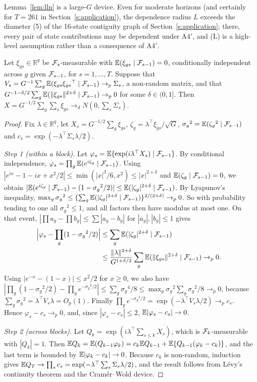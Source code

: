 \noindent Lemma~\ref{lem:lln} is a large-$G$ device. Even for moderate horizons (and certainly for
$T=261$ in Section~\ref{s:application}), the dependence radius $L$ exceeds the diameter (5) of the
16-state contiguity graph of Section~\ref{s:application}; there, every pair of state contributions
may be dependent under A4$'$, and (L) is a high-level assumption rather than a consequence of A4$'$.

\begin{lemma}
\label{lem:clt}
Let $\xi_{gs}\in\mathbb R^q$ be $\mathcal{F}_s$-measurable with $\mathbb{E}(\xi_{gs}\mid\mathcal{F}_{s-1})=0$, conditionally
independent across $g$ given $\mathcal{F}_{s-1}$, for $s=1,\dots,T$. Suppose that
$V_s=G^{-1}\sum_g\mathbb{E}(\xi_{gs}\xi_{gs}{}^{\top}\mid\mathcal{F}_{s-1})\to_p\Sigma_s$, a non-random matrix, and that
$G^{-1-\delta/2}\sum_g\mathbb{E}(\|\xi_{gs}\|^{2+\delta}\mid\mathcal{F}_{s-1})\to_p0$ for some $\delta\in(0,1]$. Then
$X=G^{-1/2}\sum_g\sum_s\xi_{gs}\to_dN(0,\sum_s\Sigma_s)$.
\end{lemma}

\begin{proof}
Fix $\lambda\in\mathbb R^q$, let $X_s=G^{-1/2}\sum_g\xi_{gs}$, $\zeta_g=\lambda^{\top}\xi_{gs}/\sqrt G$,
$\sigma_g{}^2=\mathbb{E}(\zeta_g{}^2\mid\mathcal{F}_{s-1})$ and $c_s=\exp(-\lambda^{\top}\Sigma_s\lambda/2)$.

\emph{Step 1 (within a block).} Let $\varphi_s=\mathbb{E}\{\exp(i\lambda^{\top}X_s)\mid\mathcal{F}_{s-1}\}$. By conditional
independence, $\varphi_s=\prod_g\mathbb{E}(e^{i\zeta_g}\mid\mathcal{F}_{s-1})$. Using $|e^{ix}-1-ix+x^2/2|\le\min(|x|^3/6,x^2)\le|x|^{2+\delta}$
and $\mathbb{E}(\zeta_g\mid\mathcal{F}_{s-1})=0$, we obtain
$|\mathbb{E}(e^{i\zeta_g}\mid\mathcal{F}_{s-1})-(1-\sigma_g{}^2/2)|\le\mathbb{E}(|\zeta_g|^{2+\delta}\mid\mathcal{F}_{s-1})$. By Lyapunov's
inequality,
$\max_g\sigma_g{}^2\le\{\sum_g\mathbb{E}(|\zeta_g|^{2+\delta}\mid\mathcal{F}_{s-1})\}^{2/(2+\delta)}\to_p0$.
So with probability tending to one all $\sigma_g{}^2\le1$, and all factors then have modulus at
most one. On that event, $|\prod a_g-\prod b_g|\le\sum|a_g-b_g|$ for $|a_g|,|b_g|\le1$ gives
\begin{align*}
\Bigl|\varphi_s-\prod_g(1-\sigma_g{}^2/2)\Bigr|
&\le\sum_g\mathbb{E}(|\zeta_g|^{2+\delta}\mid\mathcal{F}_{s-1})\\
&\le\frac{\|\lambda\|^{2+\delta}}{G^{1+\delta/2}}\sum_g\mathbb{E}(\|\xi_{gs}\|^{2+\delta}\mid\mathcal{F}_{s-1})\to_p0 .
\end{align*}
Using $|e^{-x}-(1-x)|\le x^2/2$ for $x\ge0$, we also have
$|\prod_g(1-\sigma_g{}^2/2)-\prod_g e^{-\sigma_g{}^2/2}|\le\sum_g\sigma_g{}^4/8\le\max_g\sigma_g{}^2\sum_g\sigma_g{}^2/8\to_p0$,
because $\sum_g\sigma_g{}^2=\lambda^{\top}V_s\lambda=O_p(1)$. Finally
$\prod_ge^{-\sigma_g{}^2/2}=\exp(-\lambda^{\top}V_s\lambda/2)\to_pc_s$. Hence $\varphi_s-c_s\to_p0$, and,
since $|\varphi_s-c_s|\le2$, $\mathbb{E}|\varphi_s-c_s|\to0$.

\emph{Step 2 (across blocks).} Let $Q_k=\exp(i\lambda^{\top}\sum_{s\le k}X_s)$, which is
$\mathcal{F}_k$-measurable with $|Q_k|=1$. Then
$\mathbb{E} Q_k=\mathbb{E}(Q_{k-1}\varphi_k)=c_k\mathbb{E} Q_{k-1}+\mathbb{E}\{Q_{k-1}(\varphi_k-c_k)\}$, and the last term is bounded
by $\mathbb{E}|\varphi_k-c_k|\to0$. Because $c_k$ is non-random, induction gives
$\mathbb{E} Q_T\to\prod_sc_s=\exp(-\lambda^{\top}\sum_s\Sigma_s\lambda/2)$, and the result follows from L\'evy's
continuity theorem and the Cram\'er--Wold device.
\end{proof}

